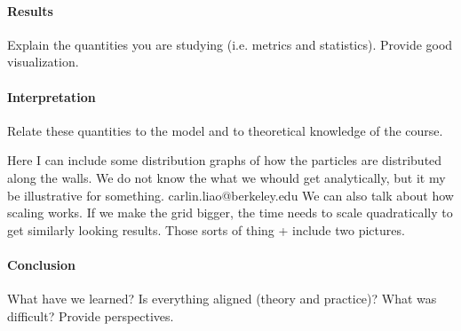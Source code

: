  \paragraph{Results}
 Explain the quantities you are studying (i.e. metrics and statistics). Provide good visualization.
 
\paragraph{Interpretation}
Relate these quantities to the model and to theoretical knowledge of the course.

Here I can include some distribution graphs of how the particles are distributed along the walls. We do not know the what we whould get analytically, but it my be illustrative for something.
carlin.liao@berkeley.edu
We can also talk about how scaling works. If we make the grid bigger, the time needs to scale quadratically to get similarly looking results. Those sorts of thing + include two pictures.

 \paragraph{Conclusion}
 What have we learned? Is everything aligned (theory and practice)? What was difficult? Provide perspectives.
 
